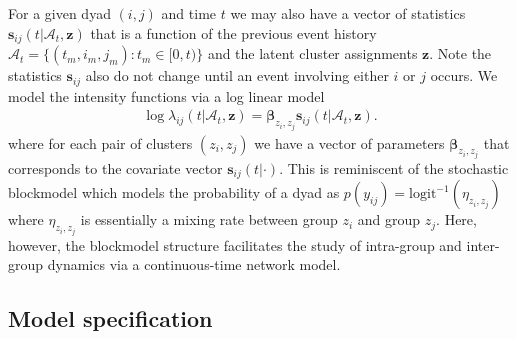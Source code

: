 \documentclass{article}
\begin{document}
For a given dyad $(i,j)$ and time $t$ we may also have a vector of statistics $\mathbf{s}_{ij}(t|\mathcal{A}_t,\mathbf{z})$ that is a function of the previous event history  $\mathcal{A}_t = \{(t_m,i_m,j_m): t_m \in [0,t)\}$  and the latent cluster assignments $\mathbf{z}$.  Note the statistics $\mathbf{s}_{ij}$ also do not change until an event involving either $i$ or $j$ occurs.  We model the intensity functions via a log linear model
\begin{align}
\log \lambda_{ij}(t | \mathcal{A}_t,\mathbf{z}) = \boldsymbol{\beta}_{z_i,z_j} \mathbf{s}_{ij}(t|\mathcal{A}_t,\mathbf{z}).
\end{align}
where for each pair of clusters $(z_i,z_j)$ we have a vector of parameters $\boldsymbol{\beta}_{z_i,z_j}$ that corresponds to the covariate vector $\mathbf{s}_{ij}(t|\cdot)$.  This is reminiscent of the stochastic blockmodel \cite{Nowicki2001,Kemp} which models the probability of a dyad as $p(y_{ij}) =\mbox{logit}^{-1}( \eta_{z_i,z_j})$ where $\eta_{z_i,z_j}$ is essentially a mixing rate between group $z_i$ and group $z_j$.  Here, however, the blockmodel structure facilitates the study of intra-group and inter-group dynamics via a continuous-time network model.

\subsection{Model specification}
\end{document}
